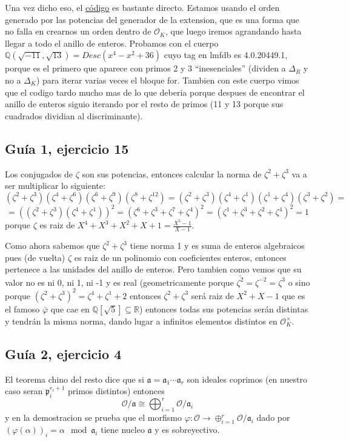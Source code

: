 \documentclass[12pt]{amsart}
\newcommand{\QQ}{\mathbb{Q}}
\newcommand{\RR}{\mathbb{R}}
\newcommand{\pp}{\mathfrak{p}}
\newcommand{\aaa}{\mathfrak{a}}
\newcommand{\OO}{\mathcal{O}}
\newcommand{\lp}{\left(}
\newcommand{\rp}{\right)}
\theoremstyle{plain}
\begin{document}
Una vez dicho eso, el \hyperref[codigo1]{código} es bastante directo. Estamos usando el orden generado por las potencias del generador de la extension, que es una forma que no falla en crearnos un orden dentro de $\OO_K$, que luego iremos agrandando hasta llegar a todo el anillo de enteros. Probamos con el cuerpo $\QQ(\sqrt{-11}, \sqrt{13}) = Desc(x^4-x^2+36)$ cuyo tag en lmfdb es 4.0.20449.1, porque es el primero que aparece con primos 2 y 3 ``inesenciales'' (dividen a $\Delta_R$ y no a $\Delta_K$) para iterar varias veces el bloque for. Tambien con este cuerpo vimos que el codigo tardo mucho mas de lo que deberia porque despues de encontrar el anillo de enteros siguio iterando por el resto de primos (11 y 13 porque sus cuadrados dividian al discriminante).



\subsection*{Guía 1, ejercicio 15}
Los conjugados de $\zeta$ son sus potencias, entonces calcular la norma
de $\zeta^2+\zeta^3$ va a ser multiplicar lo siguiente:
$$(\zeta^2+\zeta^3)(\zeta^4+\zeta^6)(\zeta^6+\zeta^9)(\zeta^8+\zeta^{12})
= (\zeta^2+\zeta^3)(\zeta^4+\zeta^1)(\zeta^1+\zeta^4)(\zeta^3+\zeta^2)=$$
$$=\lp(\zeta^2+\zeta^3)(\zeta^4+\zeta^1)\rp^2=
(\zeta^6+\zeta^3+\zeta^7+\zeta^4)^2=(\zeta^1+\zeta^3+\zeta^2+\zeta^4)^2=
1$$
porque $\zeta$ es raiz de $X^4+X^3+X^2+X+1 = \frac{X^5-1}{X-1}$.

Como ahora sabemos que $\zeta^2+\zeta^3$ tiene norma 1 y es suma de 
enteros algebraicos pues (de vuelta) $\zeta$ es raiz de un polinomio con
coeficientes enteros, entonces pertenece a las unidades del anillo de 
enteros. Pero tambien como vemos que su valor no es ni 0, ni 1, ni -1 y 
es real (geometricamente porque $\bar{\zeta^2}=\zeta^{-2} = 
\zeta^3$ o sino porque 
$(\zeta^2+\zeta^3)^2=\zeta^4+\zeta^1+2$ entonces $\zeta^2+\zeta^3$ 
será raiz de $X^2+X-1$ que es el famoso $\bar{\varphi}$ que cae en 
$\QQ[\sqrt{5}]\subseteq \RR$) entonces todas sus potencias serán 
distintas y tendrán la misma norma, dando lugar a infinitos 
elementos distintos en $\OO_K^\times$.


\subsection*{Guía 2, ejercicio 4}

El teorema chino del resto dice que si $\aaa = \aaa_1 \cdots \aaa_r$ 
son ideales coprimos (en 
nuestro caso seran $\pp_i^{e_i+1}$ primos distintos) entonces 
$$\OO / \aaa \cong \bigoplus_{i=1}^r \OO / \aaa_i$$
y en la demostracion se prueba que el morfismo $\varphi:\OO\to
\oplus_{i=1}^r \OO / \aaa_i$ dado por $\lp\varphi(\alpha)\rp_i=\alpha\mod 
\aaa_i$ tiene nucleo $\aaa$ y es sobreyectivo.
\end{document}
